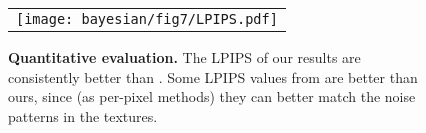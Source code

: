 \begin{figure}[!ht]
	\centering
	\begin{tabular}{c}
		\texttt{[image: bayesian/fig7/LPIPS.pdf]}
	\end{tabular}
	\caption[Quantitative evaluation]{\label{fig:bayesian:plot}
		\textbf{Quantitative evaluation.} The LPIPS of our results are consistently better than \cite{hu2019novel}. Some LPIPS values from \cite{deschaintre2018single} are better than ours, since (as per-pixel methods) they can better match the noise patterns in the textures.
	}
\end{figure}